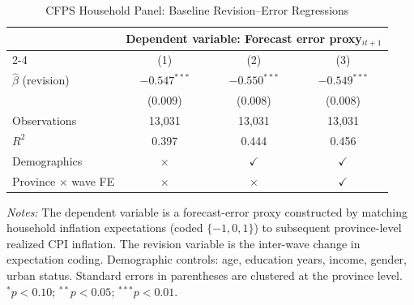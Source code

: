 \begin{table}[htbp]
\centering
\begin{threeparttable}
\caption{CFPS Household Panel: Baseline Revision--Error Regressions}
\label{tab:cfps_baseline}
{\small
\begin{tabular}{lccc}
\toprule
 & \multicolumn{3}{c}{Dependent variable: Forecast error proxy$_{it+1}$} \\
\cmidrule(lr){2-4}
 & (1) & (2) & (3) \\
\midrule
$\hat{\beta}$ (revision) & $-0.547^{***}$ & $-0.550^{***}$ & $-0.549^{***}$ \\
 & (0.009) & (0.008) & (0.008) \\
\addlinespace
Observations & 13,031 & 13,031 & 13,031 \\
$R^2$ & 0.397 & 0.444 & 0.456 \\
\addlinespace
Demographics & $\times$ & $\checkmark$ & $\checkmark$ \\
Province $\times$ wave FE & $\times$ & $\times$ & $\checkmark$ \\
\bottomrule
\end{tabular}
}
\begin{tablenotes}[flushleft]
\footnotesize
\item \textit{Notes:} The dependent variable is a forecast-error proxy constructed by matching household inflation expectations (coded $\{-1,0,1\}$) to subsequent province-level realized CPI inflation. The revision variable is the inter-wave change in expectation coding. Demographic controls: age, education years, income, gender, urban status. Standard errors in parentheses are clustered at the province level. $^{*}p<0.10$; $^{**}p<0.05$; $^{***}p<0.01$.
\end{tablenotes}
\end{threeparttable}
\end{table}
